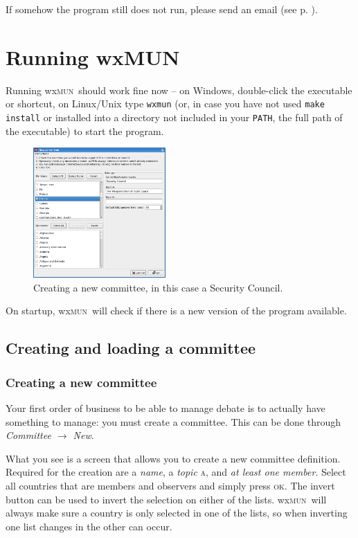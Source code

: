 \documentclass[11pt, a4paper]{article}
\newcommand\wxMUN{wx\textsc{mun}}
\begin{document}
If somehow the program still does not run, please send an email (see p. \pageref{email}).

\section{Running wxMUN}
Running \wxMUN\ should work fine now -- on Windows, double-click the executable or shortcut, on Linux/Unix type \texttt{wxmun} (or, in case you have not used \texttt{make install} or installed into a directory not included in your \texttt{PATH}, the full path of the executable) to start the program.

\begin{figure}
\includegraphics[width=0.45\textwidth]{screenshots/new_committee.png}
\caption{Creating a new committee, in this case a Security Council.}
\end{figure}

On startup, \wxMUN\ will check if there is a new version of the program available.

\subsection{Creating and loading a committee}
\subsubsection{Creating a new committee}
Your first order of business to be able to manage debate is to actually have something to manage: you must create a committee. This can be done through \emph{Committee $\rightarrow$ New}. 

What you see is a screen that allows you to create a new committee definition. Required for the creation are a \emph{name}, a \emph{topic} \textsc{a}, and \emph{at least one member}. Select all countries that are members and observers and simply press \textsc{ok}. The invert button can be used to invert the selection on either of the lists. \wxMUN\ will always make sure a country is only selected in one of the lists, so when inverting one list changes in the other can occur.
\end{document}

